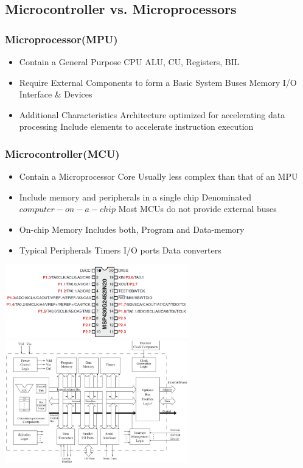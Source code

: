 \subsection{Microcontroller vs. Microprocessors }
\begin{multicols}{2}
		\subsubsection{Microprocessor(MPU) }
		\begin{itemize}
			\item Contain a General Purpose CPU
			\subitem ALU, CU, Registers, BIL %
			\item Require External Components to form a Basic System
			\subitem Buses
			\subitem Memory
			\subitem I/O Interface \& Devices
			\item Additional Characteristics
			\subitem Architecture optimized for accelerating data processing
			\subitem Include elements to accelerate instruction execution  
		\end{itemize}
\subsubsection{Microcontroller(MCU)}
		\begin{itemize}
			\item Contain a Microprocessor Core
			\subitem Usually less complex than that of an MPU
			\item Include memory and peripherals in a single chip
			\subitem Denominated $ computer-on-a-chip $ 
			\subitem Most MCUs do not provide external buses
			\item On-chip Memory
			\subitem Includes both, Program and Data-memory
			\item Typical Peripherals
			\subitem Timers
			\subitem I/O ports
			\subitem Data converters
		\end{itemize}
\end{multicols}

    \includegraphics[width=8cm]{images/msp430hardware}
	\includegraphics[width=8cm]{images/mCStructure}


